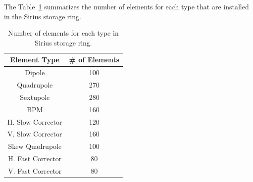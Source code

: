 The Table~\ref{tab:sirius_elements} summarizes the number of elements for each type that are installed in the Sirius storage ring.
\begin{table}
        \centering
        \caption{Number of elements for each type in Sirius storage ring.}
        \label{tab:sirius_elements}
        \begin{tabular}{cc}
            Element Type & \# of Elements \\
            \toprule\toprule
            Dipole              & 100 \\
            Quadrupole          & 270 \\
            Sextupole           & 280 \\
            \hline
            BPM & 160 \\
            H. Slow Corrector & 120 \\
            V. Slow Corrector & 160 \\
            Skew Quadrupole & 100 \\
            \hline
            H. Fast Corrector & 80 \\
            V. Fast Corrector & 80 \\
            \bottomrule\bottomrule
        \end{tabular}
\end{table}

